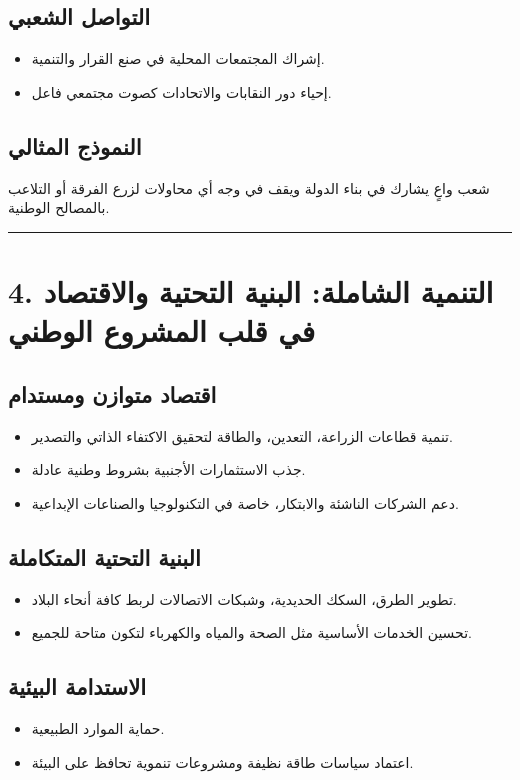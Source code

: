 \documentclass[12pt]{article}
\begin{document}
\subsection{التواصل الشعبي}
\begin{itemize}
    \item إشراك المجتمعات المحلية في صنع القرار والتنمية.
    \item إحياء دور النقابات والاتحادات كصوت مجتمعي فاعل.
\end{itemize}

\subsection{النموذج المثالي}
شعب واعٍ يشارك في بناء الدولة ويقف في وجه أي محاولات لزرع الفرقة أو التلاعب بالمصالح الوطنية.

\hrule

\section{4. التنمية الشاملة: البنية التحتية والاقتصاد في قلب المشروع الوطني}
\subsection{اقتصاد متوازن ومستدام}
\begin{itemize}
    \item تنمية قطاعات الزراعة، التعدين، والطاقة لتحقيق الاكتفاء الذاتي والتصدير.
    \item جذب الاستثمارات الأجنبية بشروط وطنية عادلة.
    \item دعم الشركات الناشئة والابتكار، خاصة في التكنولوجيا والصناعات الإبداعية.
\end{itemize}

\subsection{البنية التحتية المتكاملة}
\begin{itemize}
    \item تطوير الطرق، السكك الحديدية، وشبكات الاتصالات لربط كافة أنحاء البلاد.
    \item تحسين الخدمات الأساسية مثل الصحة والمياه والكهرباء لتكون متاحة للجميع.
\end{itemize}

\subsection{الاستدامة البيئية}
\begin{itemize}
    \item حماية الموارد الطبيعية.
    \item اعتماد سياسات طاقة نظيفة ومشروعات تنموية تحافظ على البيئة.
\end{itemize}
\end{document}

